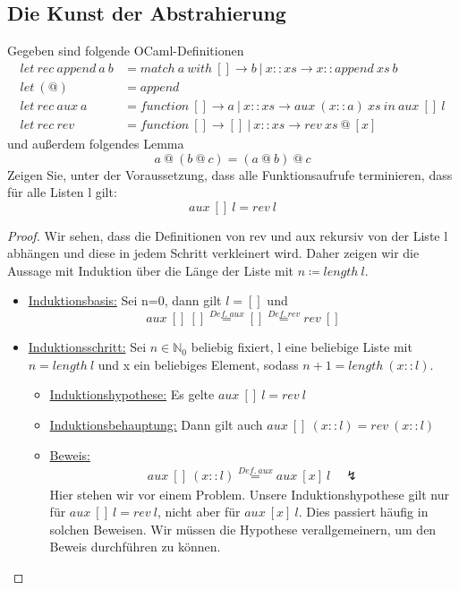 \documentclass[hidelinks]{article}
\theoremstyle{plain}
\theoremstyle{definition}
\theoremstyle{rem}
\begin{document}
\begin{sloppypar}
\subsection{Die Kunst der Abstrahierung}
Gegeben sind folgende OCaml-Definitionen
\begin{align*}
	let\ rec\ append\ a\ b &= match\ a\ with\ []\rightarrow b\ |\ x::xs\rightarrow x::append\ xs\ b\\
	let\ (@)&=append\\
	let\ rec\ aux\ a &= function\ []\rightarrow a\ |\ x::xs\rightarrow aux\ (x::a)\ xs\ in\ aux\ []\ l\\
	let\ rec\ rev &= function\ []\rightarrow []\ |\ x::xs\rightarrow rev\ xs\ @\ [x]
\end{align*}
und außerdem folgendes Lemma
\begin{equation}
	a\ @\ (b\ @\ c)=(a\ @\ b)\ @\ c \label{app_lem}
\end{equation}
Zeigen Sie, unter der Voraussetzung, dass alle Funktionsaufrufe terminieren, dass für alle Listen l gilt:
\begin{equation*}
	aux\ []\ l=rev\ l
\end{equation*}
\begin{proof}
Wir sehen, dass die Definitionen von rev und aux rekursiv von der Liste l abhängen und diese in jedem Schritt verkleinert wird. Daher zeigen wir die Aussage mit Induktion über die Länge der Liste mit $n\coloneqq length\ l$.
\begin{itemize}
\item \underline{Induktionsbasis:} Sei n=0, dann gilt $l=[]$ und
\begin{equation*}
	aux\ []\ []\stackrel{Def.\ aux}{=}[]\stackrel{Def.\ rev}{=}rev\ []
\end{equation*}
\item \underline{Induktionsschritt:} Sei $n\in \mathbb{N}_0$ beliebig fixiert, l eine beliebige Liste mit $n=length\ l$ und x ein beliebiges Element, sodass $n+1=length\ (x::l)$.
	\begin{itemize}
	\item \underline{Induktionshypothese:} Es gelte $aux\ []\ l=rev\ l$
	\item \underline{Induktionsbehauptung:} Dann gilt auch $aux\ []\ (x::l)=rev\ (x::l)$
	\item \underline{Beweis:}
	\begin{align*}
		aux\ []\ (x::l)\stackrel{Def.\ aux}{=}aux\ [x]\ l\quad\lightning
	\end{align*}
	Hier stehen wir vor einem Problem. Unsere Induktionshypothese gilt nur für $aux\ []\ l=rev\ l$, nicht aber für $aux\ [x]\ l$. Dies passiert häufig in solchen Beweisen. Wir müssen die Hypothese verallgemeinern, um den Beweis durchführen zu können.

\end{itemize}
\end{itemize}
\end{proof}
\end{sloppypar}
\end{document}
